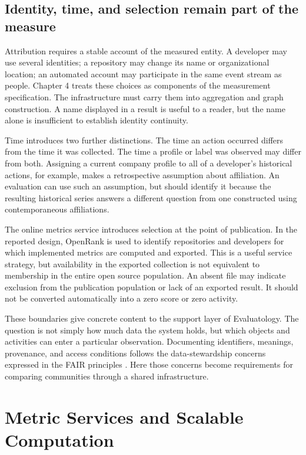 \subsection{Identity, time, and selection remain part of the measure}
Attribution requires a stable account of the measured entity. A developer may use several identities; a repository may change its name or organizational location; an automated account may participate in the same event stream as people. Chapter 4 treats these choices as components of the measurement specification. The infrastructure must carry them into aggregation and graph construction. A name displayed in a result is useful to a reader, but the name alone is insufficient to establish identity continuity.

Time introduces two further distinctions. The time an action occurred differs from the time it was collected. The time a profile or label was observed may differ from both. Assigning a current company profile to all of a developer's historical actions, for example, makes a retrospective assumption about affiliation. An evaluation can use such an assumption, but should identify it because the resulting historical series answers a different question from one constructed using contemporaneous affiliations.

The online metrics service introduces selection at the point of publication. In the reported design, OpenRank is used to identify repositories and developers for which implemented metrics are computed and exported. This is a useful service strategy, but availability in the exported collection is not equivalent to membership in the entire open source population. An absent file may indicate exclusion from the publication population or lack of an exported result. It should not be converted automatically into a zero score or zero activity.

These boundaries give concrete content to the support layer of Evaluatology. The question is not simply how much data the system holds, but which objects and activities can enter a particular observation. Documenting identifiers, meanings, provenance, and access conditions follows the data-stewardship concerns expressed in the FAIR principles \citep{wilkinson2016}. Here those concerns become requirements for comparing communities through a shared infrastructure.

\section{Metric Services and Scalable Computation}
\label{sec:ch6-services}

